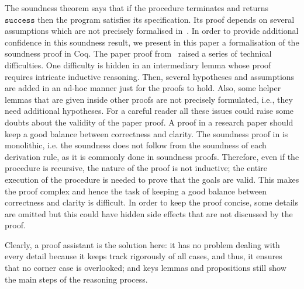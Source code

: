 \documentclass[conference]{IEEEtran}
\newenvironment{todo}{\medskip\hrule\smallskip\noindent}{\smallskip\hrule\medskip}
\newcommand{\dl}[1]{\begin{todo}\textcolor{blue}{Dorel:}\\ \color{red}{#1}\color{black}\end{todo}}
\newcommand{\dl}[1]{}
\newcommand{\success}{\mathtt{success}}
\begin{document}
The soundness theorem says that if the procedure terminates and returns $\success$ then the program satisfies its specification. %
Its proof depends on several assumptions which are not precisely formalised in~\cite{lucanu-rusu-arusoaie-nowak-LRC2015}.
In order to provide additional confidence in this soundness result, we present in this paper  a formalisation of the soundness proof in Coq.
The paper proof from~\cite{lucanu-rusu-arusoaie-nowak-LRC2015} raised a series of technical difficulties.
One difficulty is hidden in an intermediary lemma whose proof requires intricate inductive reasoning. 
Then, several hypotheses and assumptions are added in an ad-hoc  manner just for the proofs to hold.
Also, some helper lemmas that are given inside other proofs are not precisely formulated, i.e., they need additional hypotheses.
For a careful reader all these issues could raise some doubts about the validity of the paper proof.
A proof in a research paper should keep a good balance between correctness and clarity. The soundness proof in \cite{lucanu-rusu-arusoaie-nowak-LRC2015} is monolithic, i.e. the soundness does not follow from the soundness of each derivation rule, as it
is commonly done in soundness proofs. Therefore, even if the procedure is recursive, the nature of the proof is not inductive; the entire execution of the procedure is needed to prove that the goals are valid. This makes the proof complex and hence the task of keeping a good balance between correctness and clarity is difficult. In order to keep the proof concise, some details are omitted but this could have hidden side effects that are not discussed by the proof.

Clearly, a proof assistant is the solution here: it has no problem dealing with every detail because it keeps track rigorously of all cases, and thus, it  ensures that no corner case is overlooked; and keys lemmas and propositions still show the main steps of the reasoning process. \\
\end{document}
